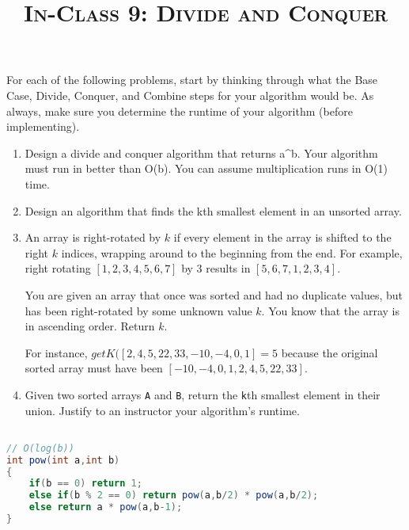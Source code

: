 \documentclass{article}
\title{\large{\textsc{In-Class 9: Divide and Conquer}}}
\date{}
\begin{document}
\maketitle

\subsection*{}

For each of the following problems, start by thinking through what the Base Case, Divide, Conquer, and Combine steps for your algorithm would be. As always, make sure you determine the runtime of your algorithm (before implementing).

\begin{enumerate}

\item Design a divide and conquer algorithm that returns a^b. Your algorithm must run in better than O(b). You can assume multiplication runs in O(1) time.

\item Design an algorithm that finds the kth smallest element in an unsorted array.

\item An array is right-rotated by $k$ if every element in the array is shifted to the right $k$ indices, wrapping around to the beginning from the end. For example, right rotating $[1, 2, 3, 4, 5, 6, 7]$ by $3$ results in $[5, 6, 7, 1, 2, 3, 4]$.

You are given an array that once was sorted and had no duplicate values, but has been right-rotated by some unknown value $k$. You know that the array is in ascending order. Return $k$.

For instance, $getK([2,4,5,22,33,-10,-4,0,1]=5$ because the original sorted array must have been $[-10,-4,0,1,2,4,5,22,33]$.

\item Given two sorted arrays \texttt{A} and \texttt{B}, return the \texttt{k}th smallest element in their union. Justify to an instructor your algorithm's runtime.

\end{enumerate}

\clearpage


\begin{lstlisting}[language=Java]

// O(log(b))
int pow(int a,int b)
{
    if(b == 0) return 1;
    else if(b % 2 == 0) return pow(a,b/2) * pow(a,b/2);
    else return a * pow(a,b-1);
}
\end{lstlisting}
\end{document}
